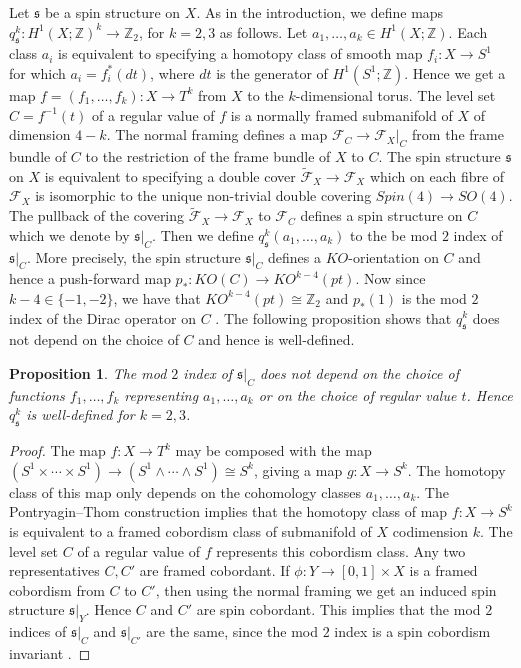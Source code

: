 \documentclass{amsart}
\newtheorem{proposition}[theorem]{Proposition}
\theoremstyle{definition}
\theoremstyle{remark}
\numberwithin{equation}{section}
\begin{document}
Let $\mathfrak{s}$ be a spin structure on $X$. As in the introduction, we define maps $q_{\mathfrak{s}}^k : H^1(X ; \mathbb{Z})^k \to \mathbb{Z}_2$, for $k=2,3$ as follows. Let $a_1, \dots , a_k \in H^1(X ; \mathbb{Z})$. Each class $a_i$ is equivalent to specifying a homotopy class of smooth map $f_i : X \to S^1$ for which $a_i = f_i^*(dt)$, where $dt$ is the generator of $H^1(S^1 ; \mathbb{Z})$. Hence we get a map $f = (f_1 ,\dots , f_k) : X \to T^k$ from $X$ to the $k$-dimensional torus. The level set $C = f^{-1}(t)$ of a regular value of $f$ is a normally framed submanifold of $X$ of dimension $4-k$. The normal framing defines a map $\mathcal{F}_C \to \mathcal{F}_X|_C$ from the frame bundle of $C$ to the restriction of the frame bundle of $X$ to $C$. The spin structure $\mathfrak{s}$ on $X$ is equivalent to specifying a double cover $\widetilde{\mathcal{F}}_X \to \mathcal{F}_X$ which on each fibre of $\mathcal{F}_X$ is isomorphic to the unique non-trivial double covering $Spin(4) \to SO(4)$. The pullback of the covering $\widetilde{\mathcal{F}}_X \to \mathcal{F}_X$ to $\mathcal{F}_C$ defines a spin structure on $C$ which we denote by $\mathfrak{s}|_C$. Then we define $q^k_{\mathfrak{s}}(a_1 , \dots , a_k)$ to the be mod $2$ index of $\mathfrak{s}|_{C}$. More precisely, the spin structure $\mathfrak{s}|_C$ defines a $KO$-orientation on $C$ and hence a push-forward map $p_* : KO(C) \to KO^{k-4}(pt)$. Now since $k-4 \in \{-1,-2\}$, we have that $KO^{k-4}(pt) \cong \mathbb{Z}_2$ and $p_*(1)$ is the mod $2$ index of the Dirac operator on $C$ \cite{as}. The following proposition shows that $q^k_{\mathfrak{s}}$ does not depend on the choice of $C$ and hence is well-defined.
\begin{proposition}\label{prop:embedded}
The mod $2$ index of $\mathfrak{s}|_C$ does not depend on the choice of functions $f_1, \dots , f_k$ representing $a_1, \dots, a_k$ or on the choice of regular value $t$. Hence $q_{\mathfrak{s}}^k$ is well-defined for $k=2,3$.
\end{proposition}
\begin{proof}
The map $f : X \to T^k$ may be composed with the map $(S^1 \times \cdots \times S^1) \to (S^1 \wedge \cdots \wedge S^1) \cong S^k$, giving a map $g : X \to S^k$. The homotopy class of this map only depends on the cohomology classes $a_1, \dots , a_k$. The Pontryagin--Thom construction implies that the homotopy class of map $f : X \to S^k$ is equivalent to a framed cobordism class of submanifold of $X$ codimension $k$. The level set $C$ of a regular value of $f$ represents this cobordism class. Any two representatives $C,C'$ are framed cobordant. If $\phi : Y \to [0,1] \times X$ is a framed cobordism from $C$ to $C'$, then using the normal framing we get an induced spin structure $\mathfrak{s}|_Y$. Hence $C$ and $C'$ are spin cobordant. This implies that the mod $2$ indices of $\mathfrak{s}|_C$ and $\mathfrak{s}|_{C'}$ are the same, since the mod $2$ index is a spin cobordism invariant \cite[Chapter III, ]{lami}. 
\end{proof}
\end{document}
